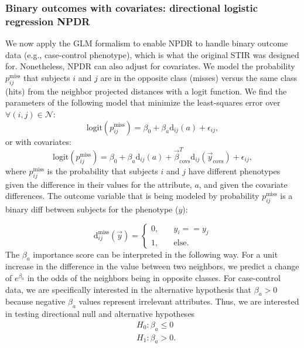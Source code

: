 \documentclass[10pt]{article}
\begin{document}
\subsubsection{Binary outcomes with covariates: directional logistic regression NPDR}
We now apply the GLM formalism to enable NPDR to handle binary outcome data (e.g., case-control phenotype), which is what the original STIR was designed for. Nonetheless, NPDR can also adjust for covariates.
We model the probability $p^{\text{miss}}_{ij}$ that subjects $i$ and $j$ are in the opposite class (misses) versus the same class (hits) from the neighbor projected distances with a logit function. We find the parameters of the following model that minimize the least-squares error over $\forall(i,j) \in \mathcal{N}$:   
\begin{equation}
\text{logit}(p^{\text{miss}}_{ij}) = \beta_0 + \beta_a \text{d}_{ij}(a) + \epsilon_{ij},   
\end{equation}
or with covariates:
\begin{equation}\label{eq:too_logit}
\text{logit}(p^{\text{miss}}_{ij}) = \beta_0 + \beta_a \text{d}_{ij}(a) + \vec{\beta}^{T}_{\text{covs}} \text{d}_{ij}(\vec{y}_{\text{covs}}) + \epsilon_{ij},   
\end{equation}
where $p^{\text{miss}}_{ij}$ is the probability that subjects $i$ and $j$ have different phenotypes given the difference in their values for the attribute, $a$, and given the covariate differences.
The outcome variable that is being modeled by probability $p^{\text{miss}}_{ij}$ is a binary diff between subjects for the phenotype ($y$):
   
\begin{equation}\label{eq:hitdiff}
\text{d}^{\text{miss}}_{ij}(\vec{y}) = \left\{
    \begin{array}{ll}
        0, & \quad  y_{i} == y_{j} \\
        1, & \quad \text{else}.
    \end{array}
\right.
\end{equation}
The $\beta_a$ importance score can be interpreted in the following way. For a unit increase in the difference in the value between two neighbors, we predict a change of $e^{\beta_a}$ in the odds of the neighbors being in opposite classes. For case-control data, we are specifically interested in the alternative hypothesis that $\beta_a>0$ because negative $\beta_a$ values represent irrelevant attributes. Thus, we are interested in testing directional null and alternative hypotheses
\begin{equation}
\begin{aligned}
    & H_0: \beta_a \le 0 \\
    & H_1: \beta_a > 0.
\end{aligned}
\end{equation}
\end{document}
